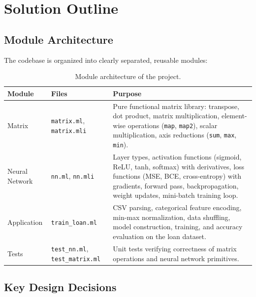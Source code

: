 \documentclass[12pt, a4paper]{article}
\begin{document}
\section{Solution Outline}

\subsection{Module Architecture}

The codebase is organized into clearly separated, reusable modules:

\begin{table}[h!]
\centering
\begin{tabular}{@{}llp{7cm}@{}}
\toprule
\textbf{Module} & \textbf{Files} & \textbf{Purpose} \\
\midrule
Matrix & \texttt{matrix.ml}, \texttt{matrix.mli} & Pure functional matrix library: transpose, dot product, matrix multiplication, element-wise operations (\texttt{map}, \texttt{map2}), scalar multiplication, axis reductions (\texttt{sum}, \texttt{max}, \texttt{min}). \\[0.3cm]
Neural Network & \texttt{nn.ml}, \texttt{nn.mli} & Layer types, activation functions (sigmoid, ReLU, tanh, softmax) with derivatives, loss functions (MSE, BCE, cross-entropy) with gradients, forward pass, backpropagation, weight updates, mini-batch training loop. \\[0.3cm]
Application & \texttt{train\_loan.ml} & CSV parsing, categorical feature encoding, min-max normalization, data shuffling, model construction, training, and accuracy evaluation on the loan dataset. \\[0.3cm]
Tests & \texttt{test\_nn.ml}, \texttt{test\_matrix.ml} & Unit tests verifying correctness of matrix operations and neural network primitives. \\
\bottomrule
\end{tabular}
\caption{Module architecture of the project.}
\end{table}

\subsection{Key Design Decisions}
\end{document}
